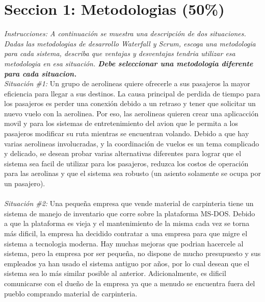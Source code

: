 \documentclass{article}
\begin{document}
\section*{Seccion 1: Metodologias (50\%)}
\emph{Instrucciones: A continuaci\'on se muestra una descripci\'on de dos situaciones. Dadas las metodologias
        de desarrollo Waterfall y Scrum, escoga una metodologia para cada sistema, describa que ventajas
        y desventajas tendria utilizar esa metodologia en esa situaci\'on. {\bf Debe seleccionar una metodologia
        diferente para cada situacion.}}
\vspace{0.5cm}\\
\emph{Situaci\'on \#1: } Un grupo de aerolineas quiere ofrecerle a sus pasajeros la
mayor eficiencia para llegar a sus destinos. La causa principal de perdida de tiempo
para los pasajeros es perder una conexi\'on debido a un retraso y tener que
solicitar un nuevo vuelo con la aerolinea. Por eso, las aerolineas quieren crear una
aplicacci\'on movil y para los sistemas de entretenimiento del avion que le permita a
los pasajeros modificar su ruta mientras se encuentran volando. Debido a que hay varias 
aerolineas involucradas, y la coordinaci\'on de vuelos es un tema complicado y delicado, 
se desean probar varias alternativas diferentes para lograr que el sistema sea facil de
utilizar para los pasajeros, reduzca los costos de operaci\'on para las aerolinas y 
que el sistema sea robusto (un asiento solamente se ocupa por un pasajero).
\vspace{30cm}\\
\vspace{5cm}\\
\emph{Situaci\'on \#2: } Una peque\~na empresa que vende material de carpinteria tiene
un sistema de manejo de inventario que corre sobre la plataforma MS-DOS. Debido a que
la plataforma es vieja y el mantenimiento de la misma cada vez se torna m\'as dificil,
la empresa ha decidido contratar a una empresa para que migre el sistema a tecnologia
moderna. Hay muchas mejoras que podrian hacercele al sistema, pero la empresa por ser
peque\~na, no dispone de mucho presupuesto y sus empleados ya han usado el sistema
antiguo por a\~nos, por lo cual desean que el sistema sea lo m\'as similar posible al
anterior. Adicionalmente, es dificil comunicarse con el due\~no de la empresa ya que
a menudo se encuentra fuera del pueblo comprando material de carpinteria.
\vspace{20cm}\\
\end{document}
